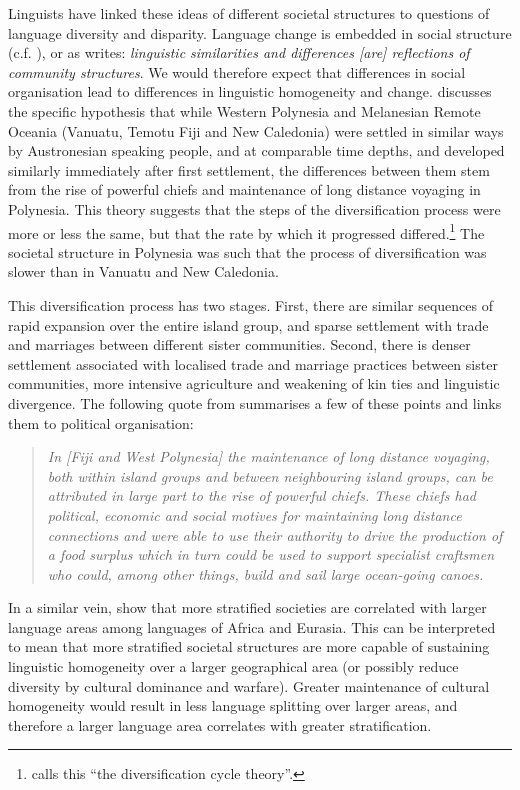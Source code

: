 \documentclass[a4paper,10pt]{article} %
\begin{document}
Linguists have linked these ideas of different societal structures to questions of language diversity and disparity. Language change is embedded in social structure (c.f. \citep{WLH1968}), or as \citet[124]{grace_1992_aberrant} writes: \emph{linguistic similarities and differences [are] reflections of community structures}. We would therefore expect that differences in social organisation lead to differences in linguistic homogeneity and change. \citet{pawley81, pawley2007} discusses the specific hypothesis that while Western Polynesia and Melanesian Remote Oceania (Vanuatu, Temotu Fiji and New Caledonia) were settled in similar ways by Austronesian speaking people, and at comparable time depths, and developed similarly immediately after first settlement, the differences between them stem from the rise of powerful chiefs and maintenance of long distance voyaging in Polynesia. This theory suggests that the steps of the diversification process were more or less the same, but that the rate by which it progressed differed.\footnote{\citet{lynch1981melanesian} calls this ``the diversification cycle theory''.} The societal structure in Polynesia was such that the process of diversification was slower than in Vanuatu and New Caledonia.

This diversification process has two stages. First, there are similar sequences of rapid expansion over the entire island group, and sparse settlement with trade and marriages between different sister communities. Second, there is denser settlement associated with localised trade and marriage practices between sister communities, more intensive agriculture and weakening of kin ties and linguistic divergence. The following quote from \citet{pawley2007} summarises a few of these points and links them to political organisation:

\begin{quotation}
\noindent \emph{In [Fiji and West Polynesia] the maintenance of long distance voyaging, both within island groups and between neighbouring island groups, can be attributed in large part to the rise of powerful chiefs. These chiefs had political, economic and social motives for maintaining long distance connections and were able to use their authority to drive the production of a food surplus which in turn could be used to support specialist craftsmen who could, among other things, build and sail large ocean-going canoes.} \citep[28]{pawley2007} \end{quotation}

In a similar vein, \citet{curriemace2009} show that more stratified societies are correlated with larger language areas among languages of Africa and Eurasia. This can be interpreted to mean that more stratified societal structures are more capable of sustaining linguistic homogeneity over a larger geographical area (or possibly reduce diversity by cultural dominance and warfare). Greater maintenance of cultural homogeneity would result in less language splitting over larger areas, and therefore a larger language area correlates with greater stratification. 
\end{document}
